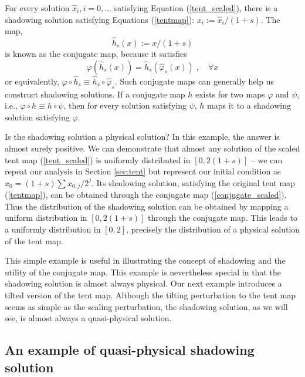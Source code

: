 For every solution $\hat{x}_i,i=0,\ldots$ satisfying Equation
(\ref{tent_scaled}), there is a shadowing solution satisfying Equations
(\ref{tentmap}): $x_i:= \hat{x}_i/(1+s)$.  The map,
\begin{equation} \label{conjugate_scaled}
    \hat{h}_s(x):=x/(1+s)
\end{equation}
is known as the conjugate map, because it satisfies
\begin{equation} \label{conjugate_def}
    \varphi(\hat{h}_s(x)) = \hat{h}_s(\hat\varphi_s(x))\;,\quad \forall x
\end{equation}
or equivalently, $\varphi\circ \hat{h}_s \equiv \hat{h}_s\circ\hat\varphi_s$.
Such conjugate maps can generally help us construct shadowing solutions.
If a conjugate map $h$ exists for two maps $\varphi$ and $\psi$, i.e.,
$\varphi\circ h \equiv h\circ\psi$, then for every solution satisfying
$\psi$, $h$ maps it to a shadowing solution satisfying $\varphi$.

Is the shadowing solution a physical solution?  In this example,
the answer is almost surely positive.  We can demonstrate that
almost any solution of the scaled tent map (\ref{tent_scaled}) is uniformly
distributed in $[0, 2(1+s)]$ -- we can repeat our analysis
in Section \ref{sec:tent} but represent our initial condition as
$x_0= (1+s) \sum x_{0,j} / 2^j$.  Its shadowing solution,
satisfying the original tent map (\ref{tentmap}), can be obtained through the
conjugate map (\ref{conjugate_scaled}).  Thus the distribution
of the shadowing solution can be obtained by mapping a uniform
distribution in $[0,2(1+s)]$ through the conjugate map.
This leads to a uniformly distribution in $[0,2]$,
precisely the distribution of a physical solution of the tent map.

This simple example is useful in illustrating the concept of shadowing
and the utility of the conjugate map.  This example is nevertheless special
in that the shadowing solution is almost always physical.  Our next
example introduces a tilted version of the tent map.  Although
the tilting perturbation to the tent map seems as simple as the
scaling perturbation, the shadowing solution, as we will see,
is almost always a quasi-physical solution.

\subsection{An example of quasi-physical shadowing solution}

